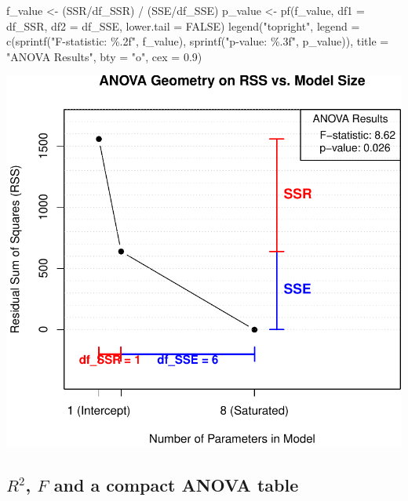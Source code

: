 \documentclass[
  letterpaper,
]{scrbook}
\newenvironment{Shaded}{\begin{snugshade}}{\end{snugshade}}
\newcommand{\AttributeTok}[1]{\textcolor[rgb]{0.40,0.45,0.13}{#1}}
\newcommand{\ConstantTok}[1]{\textcolor[rgb]{0.56,0.35,0.01}{#1}}
\newcommand{\FloatTok}[1]{\textcolor[rgb]{0.68,0.00,0.00}{#1}}
\newcommand{\FunctionTok}[1]{\textcolor[rgb]{0.28,0.35,0.67}{#1}}
\newcommand{\NormalTok}[1]{\textcolor[rgb]{0.00,0.23,0.31}{#1}}
\newcommand{\OtherTok}[1]{\textcolor[rgb]{0.00,0.23,0.31}{#1}}
\newcommand{\SpecialCharTok}[1]{\textcolor[rgb]{0.37,0.37,0.37}{#1}}
\newcommand{\StringTok}[1]{\textcolor[rgb]{0.13,0.47,0.30}{#1}}
\begin{document}
\begin{Shaded}
\begin{Highlighting}[]
\NormalTok{f\_value }\OtherTok{\textless{}{-}}\NormalTok{ (SSR}\SpecialCharTok{/}\NormalTok{df\_SSR) }\SpecialCharTok{/}\NormalTok{ (SSE}\SpecialCharTok{/}\NormalTok{df\_SSE)}
\NormalTok{p\_value }\OtherTok{\textless{}{-}} \FunctionTok{pf}\NormalTok{(f\_value, }\AttributeTok{df1 =}\NormalTok{ df\_SSR, }\AttributeTok{df2 =}\NormalTok{ df\_SSE, }\AttributeTok{lower.tail =} \ConstantTok{FALSE}\NormalTok{)}
\FunctionTok{legend}\NormalTok{(}\StringTok{"topright"}\NormalTok{,}
       \AttributeTok{legend =} \FunctionTok{c}\NormalTok{(}\FunctionTok{sprintf}\NormalTok{(}\StringTok{"F{-}statistic: \%.2f"}\NormalTok{, f\_value),}
                  \FunctionTok{sprintf}\NormalTok{(}\StringTok{"p{-}value: \%.3f"}\NormalTok{, p\_value)),}
       \AttributeTok{title =} \StringTok{"ANOVA Results"}\NormalTok{, }\AttributeTok{bty =} \StringTok{"o"}\NormalTok{, }\AttributeTok{cex =} \FloatTok{0.9}\NormalTok{)}
\end{Highlighting}
\end{Shaded}

\includegraphics{unit2-slr/slr_files/figure-pdf/unnamed-chunk-10-1.pdf}

\subsection{\texorpdfstring{\(R^2\), \(F\) and a compact ANOVA
table}{R\^{}2, F and a compact ANOVA table}}\label{r2-f-and-a-compact-anova-table}
\end{document}
